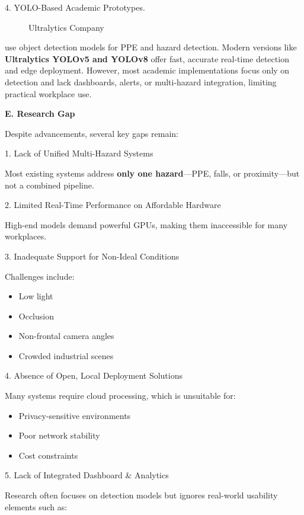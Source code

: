 4. YOLO-Based Academic Prototypes.

\begin{figure}[H]
\centering
{}
\caption{Ultralytics Company}
\end{figure}

use object detection models for PPE and hazard detection. Modern versions like \textbf{Ultralytics YOLOv5 and YOLOv8} offer fast, accurate real-time detection and edge deployment. However, most academic implementations focus only on detection and lack dashboards, alerts, or multi-hazard integration, limiting practical workplace use.

\textbf{E. Research Gap}

Despite advancements, several key gaps remain:

1. Lack of Unified Multi-Hazard Systems

Most existing systems address \textbf{only one hazard}—PPE, falls, or proximity—but not a combined pipeline.

2. Limited Real-Time Performance on Affordable Hardware

High-end models demand powerful GPUs, making them inaccessible for many workplaces.

3. Inadequate Support for Non-Ideal Conditions

Challenges include:

\begin{itemize}
\item Low light
\item Occlusion
\item Non-frontal camera angles
\item Crowded industrial scenes
\end{itemize}

4. Absence of Open, Local Deployment Solutions

Many systems require cloud processing, which is unsuitable for:

\begin{itemize}
\item Privacy-sensitive environments
\item Poor network stability
\item Cost constraints
\end{itemize}

5. Lack of Integrated Dashboard \& Analytics

Research often focuses on detection models but ignores real-world usability elements such as:

